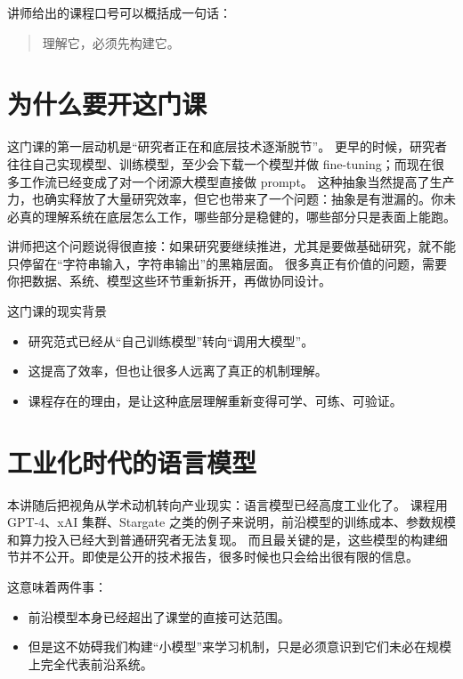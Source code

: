 \documentclass[a4paper]{article}
\begin{document}
讲师给出的课程口号可以概括成一句话：
\begin{quote}
理解它，必须先构建它。
\end{quote}

\section{为什么要开这门课}

这门课的第一层动机是“研究者正在和底层技术逐渐脱节”。
更早的时候，研究者往往自己实现模型、训练模型，至少会下载一个模型并做 fine-tuning；而现在很多工作流已经变成了对一个闭源大模型直接做 prompt。
这种抽象当然提高了生产力，也确实释放了大量研究效率，但它也带来了一个问题：抽象是有泄漏的。你未必真的理解系统在底层怎么工作，哪些部分是稳健的，哪些部分只是表面上能跑。

讲师把这个问题说得很直接：如果研究要继续推进，尤其是要做基础研究，就不能只停留在“字符串输入，字符串输出”的黑箱层面。
很多真正有价值的问题，需要你把数据、系统、模型这些环节重新拆开，再做协同设计。

\begin{knowledgebox}{这门课的现实背景}
\begin{itemize}
    \item 研究范式已经从“自己训练模型”转向“调用大模型”。
    \item 这提高了效率，但也让很多人远离了真正的机制理解。
    \item 课程存在的理由，是让这种底层理解重新变得可学、可练、可验证。
\end{itemize}
\end{knowledgebox}

\section{工业化时代的语言模型}

本讲随后把视角从学术动机转向产业现实：语言模型已经高度工业化了。
课程用 GPT-4、xAI 集群、Stargate 之类的例子来说明，前沿模型的训练成本、参数规模和算力投入已经大到普通研究者无法复现。
而且最关键的是，这些模型的构建细节并不公开。即使是公开的技术报告，很多时候也只会给出很有限的信息。

这意味着两件事：
\begin{itemize}
    \item 前沿模型本身已经超出了课堂的直接可达范围。
    \item 但是这不妨碍我们构建“小模型”来学习机制，只是必须意识到它们未必在规模上完全代表前沿系统。
\end{itemize}
\end{document}
